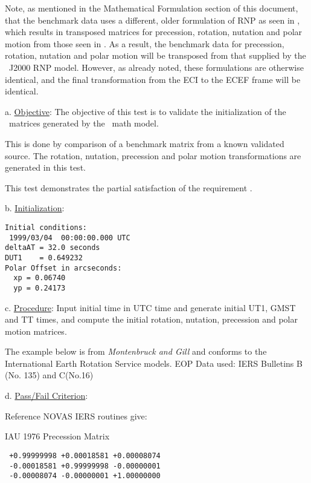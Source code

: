 Note, as mentioned in the Mathematical Formulation section of this
document, that the benchmark data uses a different, older formulation of RNP
as seen in \cite{Bond1}, which results in transposed matrices for precession,
rotation, nutation and polar motion from those seen in \cite{ValladoThird}.
As a result, the benchmark data for precession, rotation, nutation and polar
motion will be transposed from that supplied by the \JEODid\ J2000 RNP model.
However, as already noted, these formulations are otherwise identical,
and the final transformation from the ECI to the ECEF frame will be
identical.

\label{test:rnp_test1}

a. \underline{Objective}:\newline
The objective of this test is to validate the initialization
of the \ModelDesc\ matrices generated by the \ModelDesc\ math model.

This is done by comparison of a benchmark matrix from a known
validated source.  The rotation, nutation, precession and polar
motion transformations are generated in this test.\newline

This test demonstrates the partial satisfaction
of the requirement .

b. \underline{Initialization}:
\begin{verbatim}
Initial conditions:
 1999/03/04  00:00:00.000 UTC
deltaAT = 32.0 seconds
DUT1    = 0.649232
Polar Offset in arcseconds:
  xp = 0.06740
  yp = 0.24173
\end{verbatim}

c. \underline{Procedure}:\newline
Input initial time in UTC time and generate initial
UT1, GMST and TT times, and compute the
initial rotation, nutation, precession and polar motion matrices.

The example below is from {\em Montenbruck and Gill} \cite{MG}
and conforms to the International Earth Rotation Service models.
EOP Data used: IERS Bulletins B (No. 135) and C(No.16)\newline

d. \underline{Pass/Fail Criterion}:\newline

Reference NOVAS \cite{NOVAS} IERS routines give:

IAU 1976 Precession Matrix
\begin{verbatim}
 +0.99999998 +0.00018581 +0.00008074
 -0.00018581 +0.99999998 -0.00000001
 -0.00008074 -0.00000001 +1.00000000
\end{verbatim}

